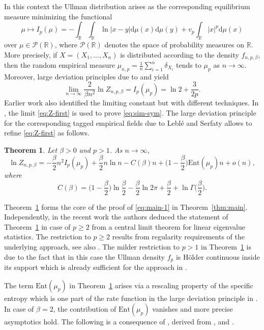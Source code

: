 \documentclass[a4paper,12pt,reqno]{amsart}
\newtheorem{theorem}{Theorem}
\theoremstyle{definition}
\newcommand{\IR}{\mathbb{R}}
\newcommand{\cP}{\mathcal{P}}
\newcommand{\Ent}{\mathrm{Ent}}
\newcommand{\dd}{\mathrm{d}}
\begin{document}
In this context the Ullman distribution arises as the corresponding equilibrium measure minimizing the functional
\[
\mu\mapsto I_p(\mu)
=-\int_{\IR}\int_{\IR} \ln|x-y|\dd\mu(x)\dd\mu(y)+v_p\int_{\IR} |x|^p\dd\mu(x)
\]
over $\mu\in \cP(\IR)$, where $\cP(\IR)$ denotes the space of probability measures on $\IR$.  More precisely, if $X=(X_1,\dots,X_n)$ is distributed according to the density $f_{n,p,\beta}$, then the random empirical measure $ \mu_{n,p} =\frac{1}{n}\sum_{i=1}^{n}\delta_{X_i} $  tends to $\mu_p$ as $n\to\infty$. Moreover, large deviation principles due to \cite{BG97} and \cite{HP00} yield 
\begin{equation} \label{eq:Z-first}
\lim_{n\to\infty}\frac{2}{\beta n^2}\ln Z_{n,p,\beta}
= I_p(\mu_p)
=\ln 2+\frac{3}{2p}.
\end{equation}
Earlier work \cite{DPS95,Joh98} also identified the limiting constant but with different techniques. In \cite{DFG+23}, the limit \eqref{eq:Z-first} is used to prove \eqref{eq:sim-sym}. The large deviation principle for the corresponding tagged empirical fields due to Lebl\'e and Serfaty \cite{LS17} allows to refine \eqref{eq:Z-first} as follows. 

\begin{theorem} \label{thm:LS}
Let $\beta>0$ and $p>1$. As $n\to\infty$,
\[
\ln Z_{n,p,\beta}
=-\frac{\beta}{2}n^2 I_p(\mu_p)+\frac{\beta}{2}n\ln n- C(\beta)n+\Big(1-\frac{\beta}{2}\Big)\Ent(\mu_p)n +o(n),
\]
where 
\begin{equation} \label{eq:c-beta}
C(\beta)
=\Big(1-\frac{\beta}{2}\Big)\ln \frac{\beta}{2}-\frac{\beta}{2}\ln 2\pi+\frac{\beta}{2}+\ln \Gamma\Big(\frac{\beta}{2}\Big).
\end{equation}
\end{theorem}

Theorem~\ref{thm:LS} forms the core of the proof of \eqref{eq:main-1} in Theorem~\ref{thm:main}. Independently, in the recent work \cite{GMP25} the authors deduced the statement of Theorem~\ref{thm:LS} in case of $p\ge 2$ from a central limit theorem for linear eigenvalue statistics. The restriction to $p\ge 2$ results from regularity requirements of the underlying approach, see also \cite{DFG+23}. The milder restriction to $p>1$ in Theorem~\ref{thm:LS} is due to the fact that in this case the Ullman density $f_p$ is Hölder continuous inside its support which is already sufficient for the approach in \cite{LS17}.

The term $\Ent(\mu_p)$ in Theorem~\ref{thm:LS} arises via a rescaling property of the specific entropy which is one part of the rate function in the large deviation principle in \cite{LS17}. In case of $\beta=2$, the contribution of $\Ent(\mu_p)$ vanishes and more precise asymptotics hold. The following is a consequence of \cite[Prop.~1.1]{CKM23}, derived from \cite{KM99}, and \cite[Thm.~1.9]{CKM23}.
\end{document}
